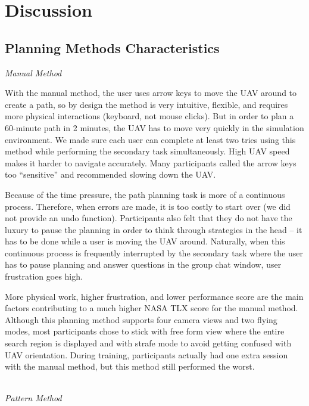 \section{Discussion} 
\label{sec:Discussion}

\subsection{Planning Methods Characteristics}

\noindent \textit{Manual Method}

With the manual method, the user uses arrow keys to move the UAV around to create a path, so by design the method is very intuitive, flexible, and requires more physical interactions (keyboard, not mouse clicks). But in order to plan a 60-minute path in 2 minutes, the UAV has to move very quickly in the simulation environment. We made sure each user can complete at least two tries using this method while performing the secondary task simultaneously. High UAV speed makes it harder to navigate accurately. Many participants called the arrow keys too ``sensitive'' and recommended slowing down the UAV. 

Because of the time pressure, the path planning task is more of a continuous process. Therefore, when errors are made, it is too costly to start over (we did not provide an undo function). Participants also felt that they do not have the luxury to pause the planning in order to think through strategies in the head -- it has to be done while a user is moving the UAV around. Naturally, when this continuous process is frequently interrupted by the secondary task where the user has to pause planning and answer questions in the group chat window, user frustration goes high. 

More physical work, higher frustration, and lower performance score are the main factors contributing to a much higher NASA TLX score for the manual method. Although this planning method supports four camera views and two flying modes, most participants chose to stick with free form view where the entire search region is displayed and with strafe mode to avoid getting confused with UAV orientation. During training, participants actually had one extra session with the manual method, but this method still performed the worst.

~\\ \noindent \textit{Pattern Method}


